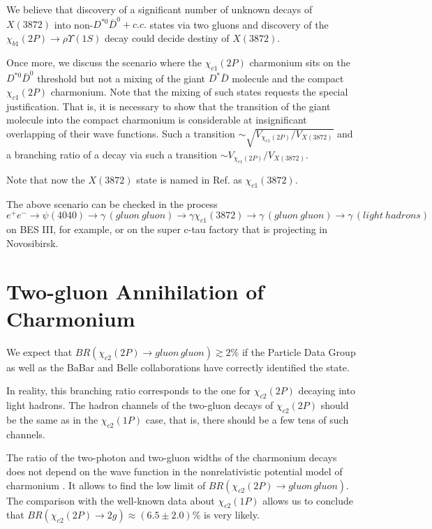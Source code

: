 \documentclass[aps,preprint,groupedaddress,floatfix]{revtex4}
\begin{document}
We believe that  discovery of a significant number of unknown
decays of $X(3872)$ into non-$D^{*0}\bar D^0 +c.c.$ states via two
gluons and discovery of the $\chi_{b1}(2P)\to\rho\Upsilon(1S)$
decay could decide destiny of $X(3872)$.

Once more, we discuss the scenario where the $\chi_{c1}(2P)$
charmonium sits on the $D^{*0}\bar D^0$ threshold but not a mixing
of the giant $D^{*}\bar D$ molecule and the compact
$\chi_{c1}(2P)$ charmonium. Note that the mixing of such states
requests the special justification. That is, it is necessary to
show that the transition of the giant molecule into the compact
charmonium is considerable at insignificant overlapping of their
wave functions. Such a transition
$\sim\sqrt{V_{\chi_{c1}(2P)}/V_{X(3872)}}$  and a branching ratio
of a decay via such a transition $\sim
V_{\chi_{c1}(2P)}/V_{X(3872)}$.

Note that now the $X(3872)$ state is named in Ref. \cite{pdg-2018}
as $\chi_{c1}(3872)$.

 The above scenario can be checked in the process
$e^+e^-\to\psi(4040)\to\gamma\,(gluon\
gluon)\to\gamma\chi_{c1}(3872)\to\gamma\,(gluon\
gluon)\to\gamma\,( light\ hadrons)$ on BES III, for example, or on
the super c-tau factory that is projecting in Novosibirsk.

\section{Two-gluon Annihilation of Charmonium \bf{}}
\label{sec-4}

 We \cite{NNA+XWK} expect that $BR(\chi_{c2}(2P)\to gluon\,
gluon)\gtrsim 2 \%$  if the Particle Data Group as well as the
BaBar and Belle collaborations have correctly identified the
state.

 In reality, this branching ratio
corresponds to the one for $\chi_{c2}(2P)$ decaying into light
hadrons. The hadron channels of the two-gluon decays of
$\chi_{c2}(2P)$ should be the same as in the $\chi_{c2}(1P)$ case,
that is, there should be a few tens of  such channels.

 The ratio
of the two-photon and two-gluon widths of the charmonium decays
does not depend on the wave function in the  nonrelativistic
potential model of charmonium \cite{iteph}. It allows to find the
low limit of $BR(\chi_{c2}(2P)\to gluon\, gluon)$. The comparison
with the well-known data about  $\chi_{c2}(1P)$ allows us to
conclude that $BR(\chi_{c2}(2P)\to2 g)\approx (6.5\pm 2.0)\%$ is
very likely.
\end{document}
